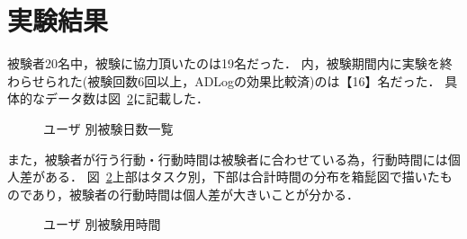 \section{実験結果}
被験者20名中，被験に協力頂いたのは19名だった．
内，被験期間内に実験を終わらせられた(被験回数6回以上，ADLogの効果比較済)のは【16】名だった．
具体的なデータ数は図~\ref{fig:day}に記載した．
\begin{figure}[hb]
	\begin{center}
		\caption{ユーザ 別被験日数一覧}
		\label{fig:day}
	\end{center}
\end{figure}

また，被験者が行う行動・行動時間は被験者に合わせている為，行動時間には個人差がある．
図~\ref{fig:day}上部はタスク別，下部は合計時間の分布を箱髭図で描いたものであり，被験者の行動時間は個人差が大きいことが分かる．
\begin{figure}[hb]
	\begin{center}
		\caption{ユーザ 別被験用時間}
		\label{fig:day}
	\end{center}
\end{figure}

